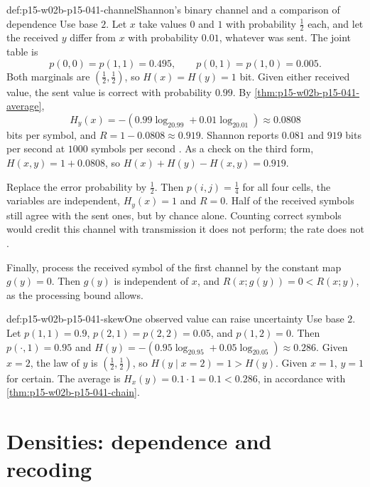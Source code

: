 \begin{hbexample}{def:p15-w02b-p15-041-channel}{Shannon's binary channel and a comparison of dependence}
Use base \(2\). Let \(x\) take values \(0\) and \(1\) with probability
\(\tfrac12\) each, and let the received \(y\) differ from \(x\) with
probability \(0.01\), whatever was sent. The joint table is
\[
 p(0,0)=p(1,1)=0.495,\qquad p(0,1)=p(1,0)=0.005 .
\]
Both marginals are \((\tfrac12,\tfrac12)\), so \(H(x)=H(y)=1\) bit.
Given either received value, the sent value is correct with
probability \(0.99\). By \cref{thm:p15-w02b-p15-041-average},
\[
 H_y(x)=-(0.99\log_20.99+0.01\log_20.01)\approx0.0808
\]
bits per symbol, and \(R=1-0.0808\approx0.919\). Shannon reports
\(0.081\) and \(919\) bits per second at \(1000\) symbols per second
\cite[p.~20]{Shannon1948MathematicalTheory}. As a check on the third
form, \(H(x,y)=1+0.0808\), so \(H(x)+H(y)-H(x,y)=0.919\).

Replace the error probability by \(\tfrac12\). Then
\(p(i,j)=\tfrac14\) for all four cells, the variables are independent,
\(H_y(x)=1\) and \(R=0\). Half of the received symbols still agree with
the sent ones, but by chance alone. Counting correct symbols would
credit this channel with transmission it does not perform; the rate
does not \cite[p.~20]{Shannon1948MathematicalTheory}.

Finally, process the received symbol of the first channel by the constant
map \(g(y)=0\). Then \(g(y)\) is independent of \(x\), and
\(R(x;g(y))=0<R(x;y)\), as the processing bound allows.
\end{hbexample}

\begin{hbexample}{def:p15-w02b-p15-041-skew}{One observed value can raise uncertainty}
Use base \(2\). Let \(p(1,1)=0.9\), \(p(2,1)=p(2,2)=0.05\), and
\(p(1,2)=0\). Then \(p(\cdot,1)=0.95\) and
\(H(y)=-(0.95\log_20.95+0.05\log_20.05)\approx0.286\). Given \(x=2\),
the law of \(y\) is \((\tfrac12,\tfrac12)\), so
\(H(y\mid x=2)=1>H(y)\). Given \(x=1\), \(y=1\) for certain. The
average is \(H_x(y)=0.1\cdot1=0.1<0.286\), in accordance with
\cref{thm:p15-w02b-p15-041-chain}.
\end{hbexample}

\section{Densities: dependence and recoding}
\label{sec:p15-w02b-p15-041-continuous}

